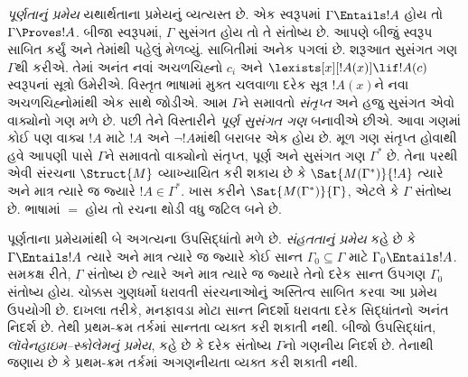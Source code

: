 \emph{પૂર્ણતાનું પ્રમેય} યથાર્થતાના પ્રમેયનું વ્યત્યસ્ત છે. એક સ્વરૂપમાં
$\Gamma \Entails !A$ હોય તો $\Gamma \Proves !A$. બીજા સ્વરૂપમાં,
$\Gamma$ સુસંગત હોય તો તે સંતોષ્ય છે. આપણે બીજું સ્વરૂપ સાબિત કર્યું અને
તેમાંથી પહેલું મેળવ્યું. સાબિતીમાં અનેક પગલાં છે. શરૂઆત સુસંગત ગણ
$\Gamma$થી કરીએ. તેમાં અનંત નવાં અચળચિહ્નો $c_i$ અને
$\lexists[x][!A(x)] \lif !A(c)$ સ્વરૂપનાં સૂત્રો ઉમેરીએ. વિસ્તૃત ભાષામાં
મુક્ત ચલવાળા દરેક સૂત્ર $!A(x)$ને નવા અચળચિહ્નોમાંથી એક સાથે જોડીએ.
આમ $\Gamma$ને સમાવતો \emph{સંતૃપ્ત} અને હજુ સુસંગત એવો વાક્યોનો ગણ મળે
છે. પછી તેને વિસ્તારીને \emph{પૂર્ણ સુસંગત ગણ} બનાવીએ છીએ. આવા ગણમાં
કોઈ પણ વાક્ય $!A$ માટે $!A$ અને $\lnot !A$માંથી બરાબર એક હોય છે. મૂળ
ગણ સંતૃપ્ત હોવાથી હવે આપણી પાસે $\Gamma$ને સમાવતો વાક્યોનો સંતૃપ્ત, પૂર્ણ
અને સુસંગત ગણ $\Gamma^*$ છે. તેના પરથી એવી સંરચના $\Struct{M}$ વ્યાખ્યાયિત
કરી શકાય છે કે $\Sat{M(\Gamma^*)}{!A}$ ત્યારે અને માત્ર ત્યારે જ જ્યારે
$!A \in \Gamma^*$. ખાસ કરીને $\Sat{M(\Gamma^*)}{\Gamma}$, એટલે કે
$\Gamma$ સંતોષ્ય છે. ભાષામાં $=$ હોય તો રચના થોડી વધુ જટિલ બને છે.

પૂર્ણતાના પ્રમેયમાંથી બે અગત્યના ઉપસિદ્ધાંતો મળે છે. \emph{સંહતતાનું
પ્રમેય} કહે છે કે $\Gamma \Entails !A$ ત્યારે અને માત્ર ત્યારે જ જ્યારે
કોઈ સાન્ત $\Gamma_0 \subseteq \Gamma$ માટે $\Gamma_0 \Entails !A$.
સમકક્ષ રીતે, $\Gamma$ સંતોષ્ય છે ત્યારે અને માત્ર ત્યારે જ જ્યારે તેનો
દરેક સાન્ત ઉપગણ $\Gamma_0$ સંતોષ્ય હોય. ચોક્કસ ગુણધર્મો ધરાવતી સંરચનાઓનું
અસ્તિત્વ સાબિત કરવા આ પ્રમેય ઉપયોગી છે. દાખલા તરીકે, મનફાવડા મોટા સાન્ત
નિદર્શો ધરાવતા દરેક સિદ્ધાંતનો અનંત નિદર્શ છે. તેથી પ્રથમ-ક્રમ તર્કમાં
સાન્તતા વ્યક્ત કરી શકાતી નથી. બીજો ઉપસિદ્ધાંત, \emph{લૉવેનહાઇમ--સ્કોલેમનું
પ્રમેય}, કહે છે કે દરેક સંતોષ્ય $\Gamma$નો ગણનીય નિદર્શ છે. તેનાથી જણાય
છે કે પ્રથમ-ક્રમ તર્કમાં અગણનીયતા વ્યક્ત કરી શકાતી નથી.
